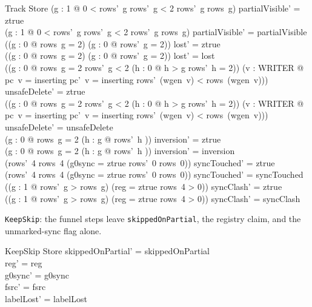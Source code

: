 \documentclass[a4paper,10pt,fleqn]{article}
\newcommand{\field}[1]{\texttt{#1}}
\begin{document}
\begin{schema}{Track}
\Delta Store
\where
(\exists g : 1  @ 0 < rows'~g \land rows'~g < 2 \land rows'~g \neq rows~g)
  \implies partialVisible' = ztrue \\
\lnot (\exists g : 1  @ 0 < rows'~g \land rows'~g < 2 \land
  rows'~g \neq rows~g) \implies partialVisible' = partialVisible \\
((\exists g : 0  @ rows~g = 2) \land
  \lnot (\exists g : 0  @ rows'~g = 2)) \implies lost' = ztrue \\
\lnot ((\exists g : 0  @ rows~g = 2) \land
  \lnot (\exists g : 0  @ rows'~g = 2)) \implies lost' = lost \\
((\exists g : 0  @ rows~g = 2 \land rows'~g < 2 \land
    \lnot (\exists h : 0  @ h > g \land rows'~h = 2)) \lor
  (\exists v : WRITER @ pc~v = inserting \land pc'~v = inserting \land
    rows'~(wgen~v) < rows~(wgen~v))) \implies unsafeDelete' = ztrue \\
\lnot ((\exists g : 0  @ rows~g = 2 \land rows'~g < 2 \land
    \lnot (\exists h : 0  @ h > g \land rows'~h = 2)) \lor
  (\exists v : WRITER @ pc~v = inserting \land pc'~v = inserting \land
    rows'~(wgen~v) < rows~(wgen~v))) \implies unsafeDelete' = unsafeDelete \\
(\exists g : 0  @ rows~g = 2 \land
  (\forall h : g  @ rows'~h )) \implies inversion' = ztrue \\
\lnot (\exists g : 0  @ rows~g = 2 \land
  (\forall h : g  @ rows'~h )) \implies inversion' = inversion \\
(rows'~4 \neq rows~4 \lor (g0sync = ztrue \land rows'~0 \neq rows~0))
  \implies syncTouched' = ztrue \\
\lnot (rows'~4 \neq rows~4 \lor (g0sync = ztrue \land rows'~0 \neq rows~0))
  \implies syncTouched' = syncTouched \\
((\exists g : 1  @ rows'~g > rows~g) \land
  (reg = ztrue \lor rows~4 > 0)) \implies syncClash' = ztrue \\
\lnot ((\exists g : 1  @ rows'~g > rows~g) \land
  (reg = ztrue \lor rows~4 > 0)) \implies syncClash' = syncClash
\end{schema}

\field{KeepSkip}: the funnel steps leave \field{skippedOnPartial}, the registry
claim, and the unmarked-sync flag alone.

\begin{schema}{KeepSkip}
\Delta Store
\where
skippedOnPartial' = skippedOnPartial \\
reg' = reg \\
g0sync' = g0sync \\
fsrc' = fsrc \\
labelLost' = labelLost
\end{schema}
\end{document}
